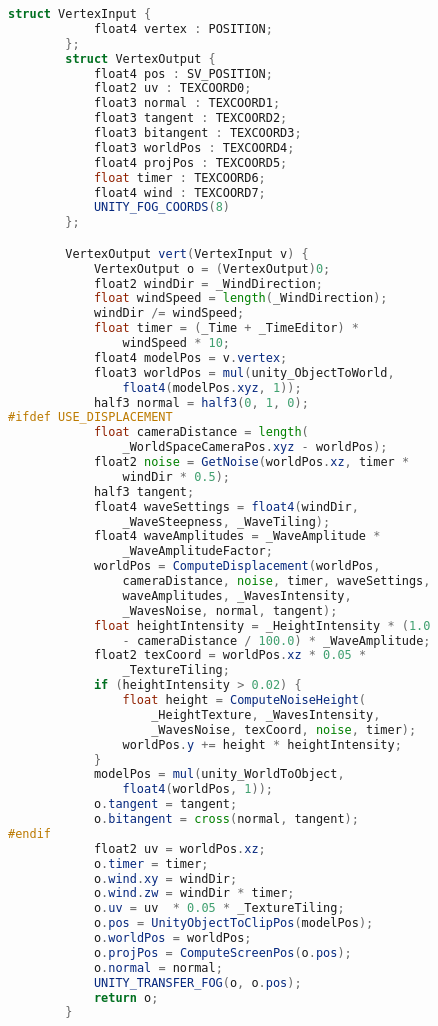 \begin{lstlisting}[language=GLSL, caption={\label{cf:agua} Shader de efeito de água na Unity}]
		struct VertexInput {
			float4 vertex : POSITION;
		};
		struct VertexOutput {
			float4 pos : SV_POSITION;
			float2 uv : TEXCOORD0;
			float3 normal : TEXCOORD1;  
			float3 tangent : TEXCOORD2;
			float3 bitangent : TEXCOORD3;
			float3 worldPos : TEXCOORD4;
			float4 projPos : TEXCOORD5;
			float timer : TEXCOORD6;
			float4 wind : TEXCOORD7; 
			UNITY_FOG_COORDS(8)
		};

		VertexOutput vert(VertexInput v) {
			VertexOutput o = (VertexOutput)0;
			float2 windDir = _WindDirection;
			float windSpeed = length(_WindDirection);
			windDir /= windSpeed;
			float timer = (_Time + _TimeEditor) * 
				windSpeed * 10;
			float4 modelPos = v.vertex;
			float3 worldPos = mul(unity_ObjectToWorld, 
				float4(modelPos.xyz, 1));
			half3 normal = half3(0, 1, 0);
#ifdef USE_DISPLACEMENT
			float cameraDistance = length(
				_WorldSpaceCameraPos.xyz - worldPos);
			float2 noise = GetNoise(worldPos.xz, timer * 
				windDir * 0.5);
			half3 tangent;
			float4 waveSettings = float4(windDir, 
				_WaveSteepness, _WaveTiling);
			float4 waveAmplitudes = _WaveAmplitude * 
				_WaveAmplitudeFactor;
			worldPos = ComputeDisplacement(worldPos, 
				cameraDistance, noise, timer, waveSettings, 
				waveAmplitudes, _WavesIntensity, 
				_WavesNoise, normal, tangent);
			float heightIntensity = _HeightIntensity * (1.0 
				- cameraDistance / 100.0) * _WaveAmplitude;
			float2 texCoord = worldPos.xz * 0.05 *
				_TextureTiling;
			if (heightIntensity > 0.02) {
				float height = ComputeNoiseHeight(
					_HeightTexture, _WavesIntensity, 
					_WavesNoise, texCoord, noise, timer);
				worldPos.y += height * heightIntensity;
			}
			modelPos = mul(unity_WorldToObject, 
				float4(worldPos, 1));
			o.tangent = tangent;
			o.bitangent = cross(normal, tangent);
#endif
			float2 uv = worldPos.xz;
			o.timer = timer;
			o.wind.xy = windDir;
			o.wind.zw = windDir * timer;
			o.uv = uv  * 0.05 * _TextureTiling;
			o.pos = UnityObjectToClipPos(modelPos);
			o.worldPos = worldPos;
			o.projPos = ComputeScreenPos(o.pos);
			o.normal = normal;
			UNITY_TRANSFER_FOG(o, o.pos);
			return o;
		}


\end{lstlisting}

